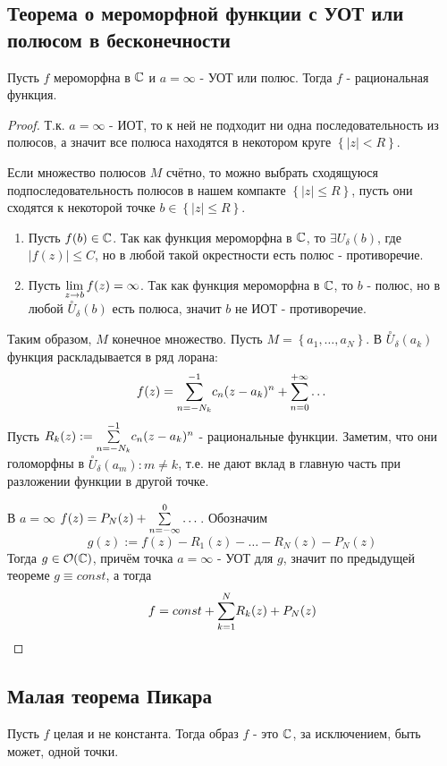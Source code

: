 \subsection{Теорема о мероморфной функции с УОТ или полюсом в бесконечности}
\begin{theorem}
  Пусть $f$ мероморфна в $\C$ и $a=\infty$ - УОТ или полюс. Тогда $f$ - рациональная функция. 
\end{theorem}
\begin{proof}
  Т.к. $a=\infty$ - ИОТ, то к ней не подходит ни одна последовательность из полюсов, а значит все полюса находятся в некотором круге $\left\{|z|<R\right\}$.

  Если множество полюсов $M$ счётно, то можно выбрать сходящуюся подпоследовательность полюсов в нашем компакте $\left\{|z|\leqslant R\right\}$, пусть они сходятся к некоторой точке $b\in \left\{|z|\leqslant R\right\}$.
  \begin{enumerate}
    \item Пусть $f(b)\in\C$. Так как функция мероморфна в $\C$, то $\exists U_\delta(b)$, где $|f(z)|\leqslant C$, но в любой такой окрестности есть полюс - противоречие.
    \item Пусть $\Lim{z}{b}f(z) = \infty$. Так как функция мероморфна в $\C$, то $b$ - полюс, но в любой $\overset{\circ}{U}_\delta(b)$ есть полюса, значит $b$ не ИОТ - противоречие. 
  \end{enumerate}

  Таким образом, $M$ конечное множество. Пусть $M = \left\{a_1,\dots,a_N\right\}$. В $\overset{\circ}{U}_\delta(a_k)$ функция раскладывается в ряд лорана:
  \[f(z) = \Sum{n=-N_k}{-1}c_{n}(z-a_k)^n + \Sum{n=0}{+\infty}\dots\]
  Пусть $R_k(z):=\Sum{n=-N_k}{-1}c_{n}(z-a_k)^n$ - рациональные функции. Заметим, что они голоморфны в $\overset{\circ}{U}_\delta(a_m)\colon m\neq k$, т.е. не дают вклад в главную часть при разложении функции в другой точке.

  В $a=\infty$ $f(z) = P_N(z) + \Sum{n=-\infty}{0}\dots$. Обозначим
   \[g(z) := f(z) - R_1(z) - \dots - R_N(z) - P_N(z)\]
   Тогда $g\in\O(\C)$, причём точка $a=\infty$ - УОТ для $g$, значит по предыдущей теореме $g\equiv const$, а тогда
   \[f = const + \Sum{k=1}{N}R_k(z) + P_N(z)\] 
\end{proof}
\subsection{Малая теорема Пикара}
\begin{theorem}
  Пусть $f$ целая и не константа. Тогда образ $f$ - это $\C$, за исключением, быть может, одной точки.
\end{theorem}
